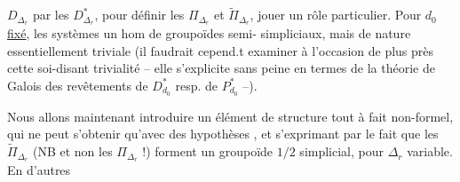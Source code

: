 $D_{\Delta_r}$ par les $D^*_{\Delta_r}$, pour définir les
$\Pi_{\Delta_r}$ et $\widetilde\Pi_{\Delta_r}$, 
jouer un rôle particulier.
Pour \uline{$d_0$ fixé}, les systèmes
 un hom de groupoïdes semi-
simpliciaux, mais de nature essentiellement
triviale (il faudrait cepend.t examiner
à l'occasion de plus près cette soi-disant
trivialité --  elle s'explicite sans peine
en termes de la théorie de Galois
des revêtements de $D^*_{d_0}$ resp. de $P^*_{d_0}$ --).

Nous allons maintenant introduire
un élément de structure tout à fait
non-formel, qui ne peut s'obtenir
qu'avec des hypothèses 
, et s'exprimant
par le fait que les $\widetilde\Pi_{\Delta_r}$ (NB et
non les $\Pi_{\Delta_r}$ !) forment un groupoïde
$1/2$ simplicial, pour $\Delta_r$ variable. En d'autres
